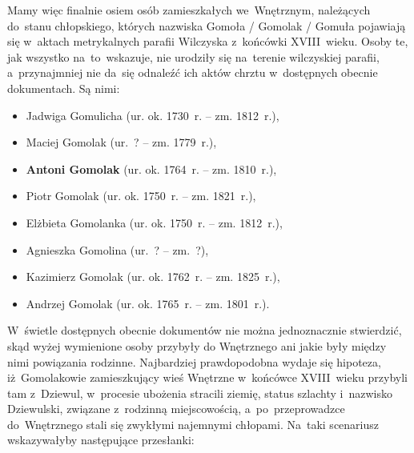 Mamy więc finalnie osiem osób zamieszkałych we~Wnętrznym, należących do~stanu 
chłopskiego, których nazwiska Gomoła / Gomolak / Gomuła pojawiają się 
w~aktach metrykalnych parafii Wilczyska z~końcówki XVIII~wieku. Osoby te, jak 
wszystko na~to~wskazuje, nie urodziły się na~terenie wilczyskiej parafii,
a~przynajmniej nie da~się odnaleźć ich aktów chrztu w~dostępnych obecnie
dokumentach. Są nimi:

\begin{itemize}
    \item Jadwiga Gomulicha
    (ur. ok. 1730~r. -- zm. 1812~r.),
    \item Maciej Gomolak (ur.~? --
    zm. 1779~r.),
    \item \textbf{Antoni Gomolak}
    (ur. ok. 1764~r. -- zm. 1810~r.),
    \item Piotr Gomolak (ur. ok.
    1750~r. -- zm. 1821~r.),
    \item Elżbieta Gomolanka
    (ur. ok. 1750~r. -- zm. 1812~r.),
    \item Agnieszka Gomolina
    (ur.~? -- zm.~?),
    \item Kazimierz Gomolak
    (ur. ok. 1762~r. -- zm. 1825~r.),
    \item Andrzej Gomolak
    (ur. ok. 1765~r. -- zm. 1801~r.). 
  \end{itemize}

W~świetle dostępnych obecnie dokumentów nie można jednoznacznie stwierdzić, 
skąd wyżej wymienione osoby przybyły do Wnętrznego ani jakie były między nimi 
powiązania rodzinne. Najbardziej prawdopodobna wydaje się hipoteza,
iż~Gomolakowie zamieszkujący wieś Wnętrzne w~końcówce XVIII~wieku przybyli 
tam z~Dziewul, w~procesie ubożenia stracili ziemię, status szlachty 
i~nazwisko Dziewulski, związane z~rodzinną miejscowością, a~po~przeprowadzce 
do~Wnętrznego stali się zwykłymi najemnymi chłopami. Na~taki scenariusz 
wskazywałyby następujące przesłanki:

